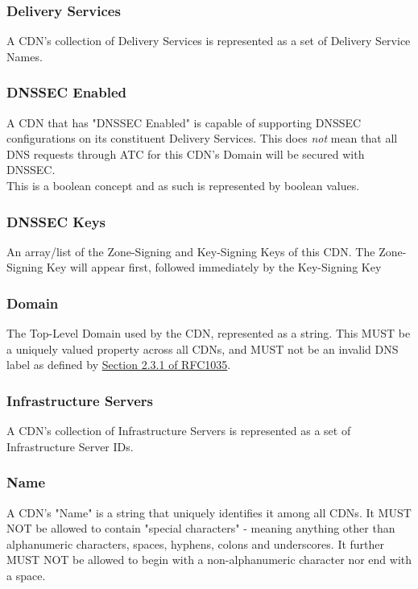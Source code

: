 \subsubsection{Delivery Services}
A CDN's collection of Delivery Services is represented as a set of Delivery
Service Names.

\subsubsection{DNSSEC Enabled}
A CDN that has "DNSSEC Enabled" is capable of supporting DNSSEC configurations on
its constituent Delivery Services. This does \emph{not} mean that all DNS
requests through ATC for this CDN's Domain will be secured with DNSSEC.\\
This is a boolean concept and as such is represented by boolean values.

\subsubsection{DNSSEC Keys}
An array/list of the Zone-Signing and Key-Signing Keys of this CDN. The
Zone-Signing Key will appear first, followed immediately by the Key-Signing Key

\subsubsection{Domain}
The Top-Level Domain used by the CDN, represented as a string. This MUST be a
uniquely valued property across all CDNs, and MUST not be an invalid DNS label as
defined by
\href{https://tools.ietf.org/html/rfc1035#section-2.3.1}{Section 2.3.1 of RFC1035}.

\subsubsection{Infrastructure Servers}
A CDN's collection of Infrastructure Servers is represented as a set of
Infrastructure Server IDs.

\subsubsection{Name}
A CDN's "Name" is a string that uniquely identifies it among all CDNs. It MUST
NOT be allowed to contain "special characters" - meaning anything other than
alphanumeric characters, spaces, hyphens, colons and underscores. It further MUST
NOT be allowed to begin with a non-alphanumeric character nor end with a space.

